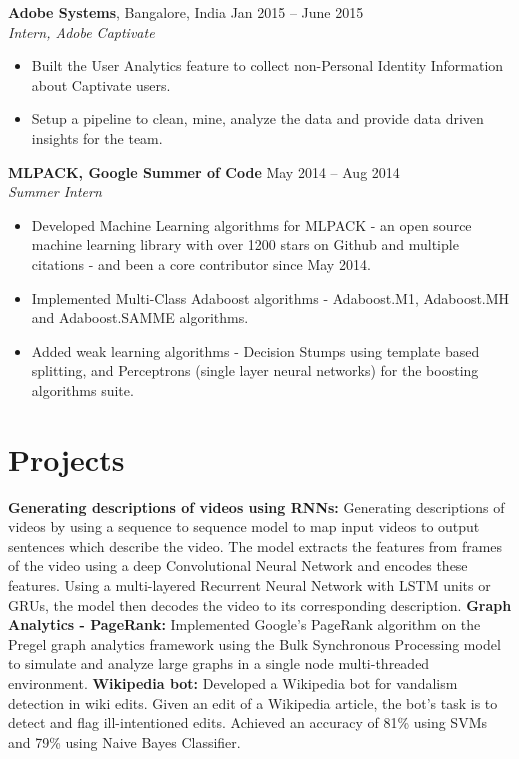 \documentclass[letterpaper]{article}
\begin{document}
\vspace{-0.5mm}
\textbf{Adobe Systems}, Bangalore, India \hfill Jan 2015 -- June 2015\\
\emph{Intern, Adobe Captivate}\\
\vspace{-6mm}
\begin{itemize}
\item Built the User Analytics feature to collect non-Personal Identity Information about Captivate users. 
\vspace{-2mm}
\item Setup a pipeline to clean, mine, analyze the data and provide data driven insights for the team.
\end{itemize}

\vspace{-0.6mm}

\textbf{MLPACK, Google Summer of Code} \hfill May 2014 -- Aug 2014\\
\emph{Summer Intern}\\
\vspace{-6mm}
\begin{itemize}
\item Developed Machine Learning algorithms for MLPACK - an open source machine learning library with over 1200 stars on Github and multiple citations - and been a core contributor since May 2014.
\vspace{-2mm}
\item Implemented Multi-Class Adaboost algorithms - Adaboost.M1, Adaboost.MH and Adaboost.SAMME algorithms.
\vspace{-2mm}
\item Added weak learning algorithms - Decision Stumps using template based splitting, and Perceptrons (single layer neural networks) for the boosting algorithms suite.
\end{itemize}

\section*{Projects}
\textbf{Generating descriptions of videos using RNNs:}
Generating descriptions of videos by using a sequence to sequence model to map input videos to output sentences which describe the video. The model extracts the features from frames of the video using a deep Convolutional Neural Network and encodes these features. Using a multi-layered Recurrent Neural Network with LSTM units or GRUs, the model then decodes the video to its corresponding description.
\vspace{1mm} \newline
\textbf{Graph Analytics - PageRank:} 
Implemented Google's PageRank algorithm on the Pregel graph analytics framework using the Bulk Synchronous Processing model to simulate and analyze large graphs in a single node multi-threaded environment.
\vspace{1mm} \newline
\textbf{Wikipedia bot:}
Developed a Wikipedia bot for vandalism detection in wiki edits. Given an edit of a Wikipedia article, the bot's task is to detect and flag ill-intentioned edits. Achieved an accuracy of 81\% using SVMs and 79\% using Naive Bayes Classifier.
\end{document}
